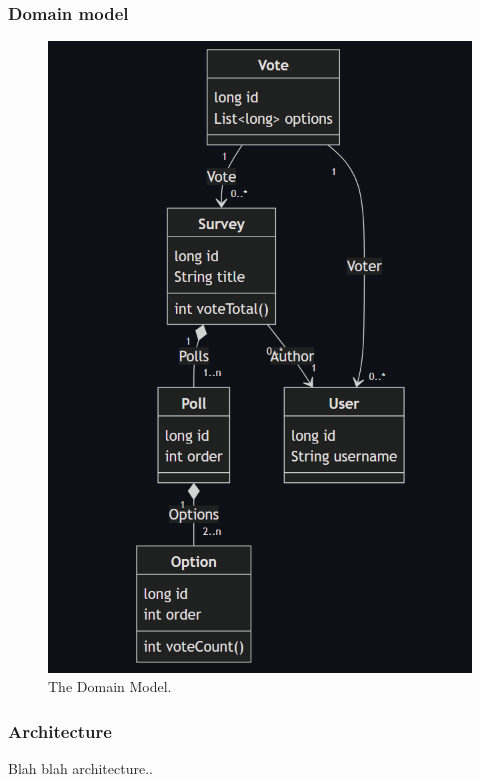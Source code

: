 \subsubsection*{Domain model}
\begin{figure}[thb]
	\centering
	\includegraphics[scale=0.5]{figs/domainmodel.png}
	\caption{The Domain Model.}
	\label{fig:domainmodel}
\end{figure}

\subsubsection*{Architecture}
Blah blah architecture..



